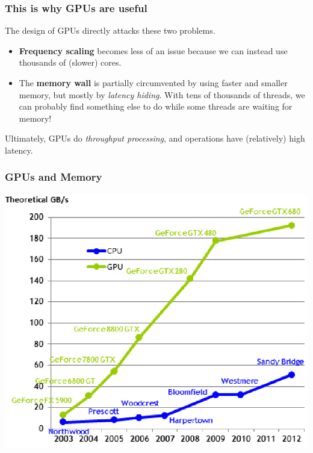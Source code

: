 \documentclass{beamer}
\begin{document}
\begin{frame}
  \frametitle{This is why GPUs are useful}

  The design of GPUs directly attacks these two problems.

  \begin{itemize}
  \item\textbf{Frequency scaling} becomes less of an issue because we
    can instead use thousands of (slower) cores.

  \item The \textbf{memory wall} is partially circumvented by using
    faster and smaller memory, but mostly by \textit{latency hiding}.
    With tens of thousands of threads, we can probably find something
    else to do while some threads are waiting for memory!
  \end{itemize}

  Ultimately, GPUs do \textit{throughput processing}, and operations
  have (relatively) high latency.

\end{frame}

\begin{frame}[fragile,t]
\frametitle{GPUs and Memory}

\begin{center}
\includegraphics[height=45ex]{img/gpubandwidth.png}
\end  {center}

\end{frame}
\end{document}
